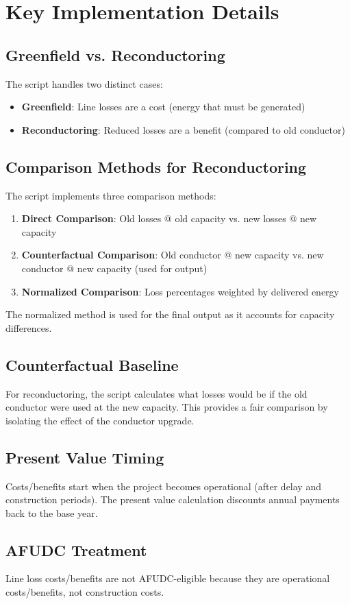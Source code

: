 \documentclass[ctcc_full_documentation.tex]{subfiles}
\begin{document}
\section{Key Implementation Details}

\subsection{Greenfield vs. Reconductoring}

The script handles two distinct cases:
\begin{itemize}
    \item \textbf{Greenfield}: Line losses are a cost (energy that must be generated)
    \item \textbf{Reconductoring}: Reduced losses are a benefit (compared to old conductor)
\end{itemize}

\subsection{Comparison Methods for Reconductoring}

The script implements three comparison methods:
\begin{enumerate}
    \item \textbf{Direct Comparison}: Old losses @ old capacity vs. new losses @ new capacity
    \item \textbf{Counterfactual Comparison}: Old conductor @ new capacity vs. new conductor @ new capacity (used for output)
    \item \textbf{Normalized Comparison}: Loss percentages weighted by delivered energy
\end{enumerate}

The normalized method is used for the final output as it accounts for capacity differences.

\subsection{Counterfactual Baseline}

For reconductoring, the script calculates what losses would be if the old conductor were used at the new capacity. This provides a fair comparison by isolating the effect of the conductor upgrade.

\subsection{Present Value Timing}

Costs/benefits start when the project becomes operational (after delay and construction periods). The present value calculation discounts annual payments back to the base year.

\subsection{AFUDC Treatment}

Line loss costs/benefits are not AFUDC-eligible because they are operational costs/benefits, not construction costs.
\end{document}
